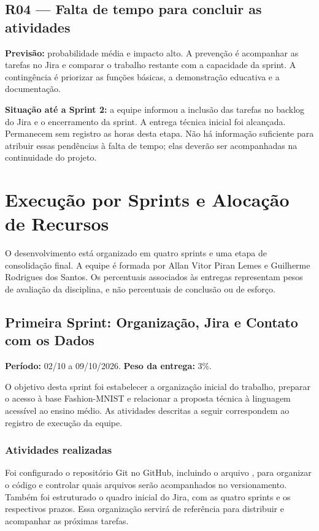 \documentclass[12pt,a4paper]{article}
\begin{document}
\subsection*{R04 — Falta de tempo para concluir as atividades}
\textbf{Previsão:} probabilidade média e impacto alto. A prevenção é acompanhar as tarefas no Jira e comparar o trabalho restante com a capacidade da sprint. A contingência é priorizar as funções básicas, a demonstração educativa e a documentação.

\textbf{Situação até a Sprint 2:} a equipe informou a inclusão das tarefas no backlog do Jira e o encerramento da sprint. A entrega técnica inicial foi alcançada. Permanecem sem registro as horas desta etapa. Não há informação suficiente para atribuir essas pendências à falta de tempo; elas deverão ser acompanhadas na continuidade do projeto.

\section{Execução por Sprints e Alocação de Recursos}
O desenvolvimento está organizado em quatro sprints e uma etapa de consolidação final. A equipe é formada por Allan Vitor Piran Lemes e Guilherme Rodrigues dos Santos. Os percentuais associados às entregas representam pesos de avaliação da disciplina, e não percentuais de conclusão ou de esforço.

\subsection{Primeira Sprint: Organização, Jira e Contato com os Dados}
\textbf{Período:} 02/10 a 09/10/2026. \textbf{Peso da entrega:} 3\%.

O objetivo desta sprint foi estabelecer a organização inicial do trabalho, preparar o acesso à base Fashion-MNIST e relacionar a proposta técnica à linguagem acessível ao ensino médio. As atividades descritas a seguir correspondem ao registro de execução da equipe.

\subsubsection{Atividades realizadas}
Foi configurado o repositório Git no GitHub, incluindo o arquivo , para organizar o código e controlar quais arquivos serão acompanhados no versionamento. Também foi estruturado o quadro inicial do Jira, com as quatro sprints e os respectivos prazos. Essa organização servirá de referência para distribuir e acompanhar as próximas tarefas.
\end{document}
